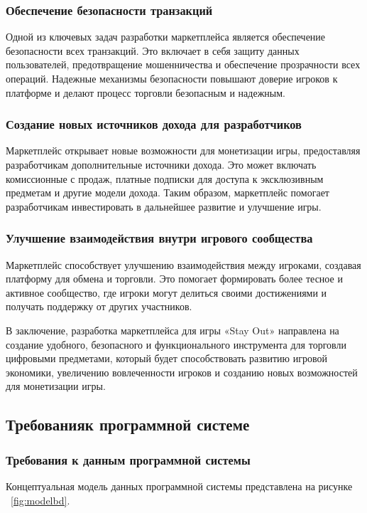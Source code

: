 \subsubsection{Обеспечение безопасности транзакций}
Одной из ключевых задач разработки маркетплейса является обеспечение безопасности всех транзакций. Это включает в себя защиту данных пользователей, предотвращение мошенничества и обеспечение прозрачности всех операций. Надежные механизмы безопасности повышают доверие игроков к платформе и делают процесс торговли безопасным и надежным.

\subsubsection{Создание новых источников дохода для разработчиков}
Маркетплейс открывает новые возможности для монетизации игры, предоставляя разработчикам дополнительные источники дохода. Это может включать комиссионные с продаж, платные подписки для доступа к эксклюзивным предметам и другие модели дохода. Таким образом, маркетплейс помогает разработчикам инвестировать в дальнейшее развитие и улучшение игры.

\subsubsection{Улучшение взаимодействия внутри игрового сообщества}
Маркетплейс способствует улучшению взаимодействия между игроками, создавая платформу для обмена и торговли. Это помогает формировать более тесное и активное сообщество, где игроки могут делиться своими достижениями и получать поддержку от других участников.

В заключение, разработка маркетплейса для игры «Stay Out» направлена на создание удобного, безопасного и функционального инструмента для торговли цифровыми предметами, который будет способствовать развитию игровой экономики, увеличению вовлеченности игроков и созданию новых возможностей для монетизации игры.


\subsection{Требованияк программной системе}

\subsubsection{Требования к данным программной системы}

Концептуальная модель данных программной системы представлена на рисунке ~\ref{fig:modelbd}.

